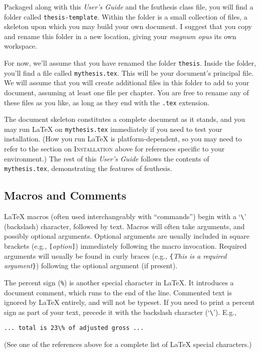 \documentclass[11pt,letterpaper]{article}
\newcommand*{\booktitle}[1]{\textit{#1}}
\newcommand*{\complit}[1]{\texttt{#1}}
\newcommand*{\latexclass}[1]{\textsf{#1}}
\newcommand*{\fsuth}{\latexclass{fsuthesis}}
\renewcommand{\-}{\discretionary{}{}{}}
\begin{document}
Packaged along with this \booktitle{User's Guide} and the \fsuth{}
class file, you will find a folder called \complit{thesis-template}.
Within the folder is a small collection of files, a skeleton upon
which you may build your own document.  I suggest that you copy and
rename this folder in a new location, giving your \emph{magnum opus}
its own workspace.

For now, we'll assume that you have renamed the folder
\complit{thesis}.  Inside the folder, you'll find a file called
\complit{mythesis.tex}.  This will be your document's principal file.
We will assume that you will create additional files in this folder to
add to your document, assuming at least one file per chapter.  You are
free to rename any of these files as you like, as long as they end
with the \complit{.tex} extension.

The document skeleton constitutes a complete document as it stands,
and you may run \LaTeX{} on \complit{mythesis.tex} immediately if you
need to test your installation.  (How you run \LaTeX{} is
platform-dependent, so you may need to refer to the section on
\textsc{Installation} above for references specific to your
environment.)  The rest of this \booktitle{User's Guide} follows the
contents of \complit{mythesis.tex}, demonstrating the features of
\fsuth.

\subsection{Macros and Comments}

\LaTeX{} macros (often used interchangeably with ``commands'') begin
with a `\verb+\+' (backslash) character, followed by text.  Macros
will often take arguments, and possibly optional arguments.  Optional
arguments are usually included in square brackets (e.g.,
\verb+[+\textit{option}\verb+]+) immediately following the macro
invocation.  Required arguments will usually be found in curly braces
(e.g., \verb+{+\textit{This is a required argument}\verb+}+) following
the optional argument (if present).

The percent sign (\verb+%+) is another special character in \LaTeX{}.
It introduces a document comment, which runs to the end of the line.
Commented text is ignored by \LaTeX{} entirely, and will not be typeset.
If you need to print a percent sign as part of your text, precede it
with the backslash character (`\verb+\+').  E.g.,
\begin{verbatim}
... total is 23\% of adjusted gross ...
\end{verbatim}
(See one of the references above for a complete list of \LaTeX{}
special characters.)
\end{document}
